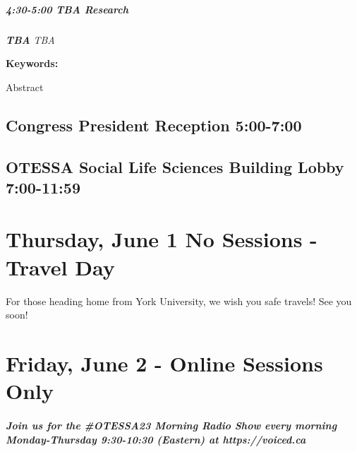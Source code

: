 \documentclass[
]{book}
\begin{document}
\begin{session}
\hypertarget{tba-research}{%
\paragraph*{\texorpdfstring{4:30-5:00 \textbar{} \textbf{TBA} \textbar{}
Research}{4:30-5:00 \textbar{} TBA \textbar{} Research}}\label{tba-research}}

\textbf{\emph{TBA}} \textbar{} \emph{TBA}

\textbf{Keywords:}

Abstract
\end{session}

\hypertarget{congress-president-reception-500-700}{%
\section*{Congress President Reception \textbar{} 5:00-7:00}\label{congress-president-reception-500-700}}

\hypertarget{otessa-social-life-sciences-building-lobby-700-1159-2}{%
\section*{OTESSA Social \textbar{} Life Sciences Building Lobby \textbar{} 7:00-11:59}\label{otessa-social-life-sciences-building-lobby-700-1159-2}}

\hypertarget{thursday-june-1-no-sessions---travel-day}{%
\chapter{Thursday, June 1 \textbar{} No Sessions - Travel Day}\label{thursday-june-1-no-sessions---travel-day}}

For those heading home from York University, we wish you safe travels! See you soon!

\hypertarget{friday-june-2---online-sessions-only}{%
\chapter{Friday, June 2 - Online Sessions Only}\label{friday-june-2---online-sessions-only}}

\begin{protip}
\hypertarget{join-us-for-the-otessa23-morning-radio-show-every-morning-monday-thursday-930-1030-eastern-at-httpsvoiced.ca}{%
\paragraph{Join us for the \#OTESSA23 Morning Radio Show every morning
Monday-Thursday 9:30-10:30 (Eastern) at
https://voiced.ca}\label{join-us-for-the-otessa23-morning-radio-show-every-morning-monday-thursday-930-1030-eastern-at-httpsvoiced.ca}}
\end{protip}
\end{document}
